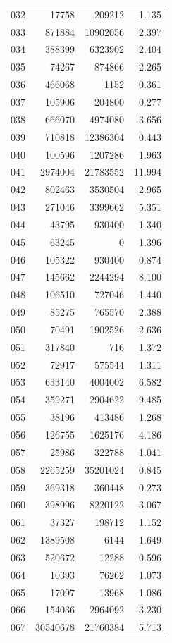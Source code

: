 \documentclass[anonymous,notoc]{gmcm2026}
\begin{document}
\begin{longtable}{lrrr}
032 & 17758 & 209212 & 1.135 \\
033 & 871884 & 10902056 & 2.397 \\
034 & 388399 & 6323902 & 2.404 \\
035 & 74267 & 874866 & 2.265 \\
036 & 466068 & 1152 & 0.361 \\
037 & 105906 & 204800 & 0.277 \\
038 & 666070 & 4974080 & 3.656 \\
039 & 710818 & 12386304 & 0.443 \\
040 & 100596 & 1207286 & 1.963 \\
041 & 2974004 & 21783552 & 11.994 \\
042 & 802463 & 3530504 & 2.965 \\
043 & 271046 & 3399662 & 5.351 \\
044 & 43795 & 930400 & 1.340 \\
045 & 63245 & 0 & 1.396 \\
046 & 105322 & 930400 & 0.874 \\
047 & 145662 & 2244294 & 8.100 \\
048 & 106510 & 727046 & 1.440 \\
049 & 85275 & 765570 & 2.388 \\
050 & 70491 & 1902526 & 2.636 \\
051 & 317840 & 716 & 1.372 \\
052 & 72917 & 575544 & 1.311 \\
053 & 633140 & 4004002 & 6.582 \\
054 & 359271 & 2904622 & 9.485 \\
055 & 38196 & 413486 & 1.268 \\
056 & 126755 & 1625176 & 4.186 \\
057 & 25986 & 322788 & 1.041 \\
058 & 2265259 & 35201024 & 0.845 \\
059 & 369318 & 360448 & 0.273 \\
060 & 398996 & 8220122 & 3.067 \\
061 & 37327 & 198712 & 1.152 \\
062 & 1389508 & 6144 & 1.649 \\
063 & 520672 & 12288 & 0.596 \\
064 & 10393 & 76262 & 1.073 \\
065 & 17097 & 13968 & 1.086 \\
066 & 154036 & 2964092 & 3.230 \\
067 & 30540678 & 21760384 & 5.713 \\

\end{longtable}
\end{document}

